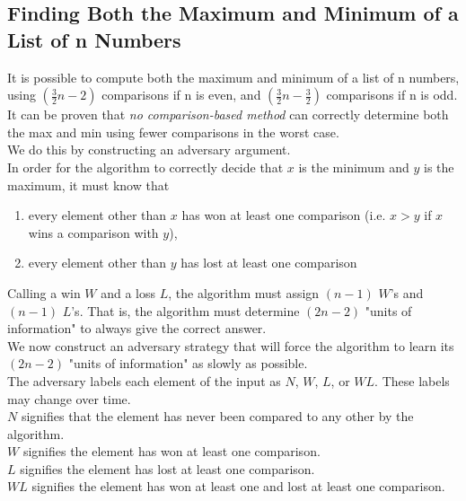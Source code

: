 \documentclass[12pt]{article}
\theoremstyle{plain}
\theoremstyle{definition}
\newcommand{\lecture}[1]{\marginpar{{\footnotesize $\leftarrow$ \underline{#1}}}}
\begin{document}
\subsection{Finding Both the Maximum and Minimum of a List of n Numbers}
It is possible to compute both the maximum and minimum of a list of n numbers, using $(\frac{3}{2}n - 2)$ comparisons if n is even, and $(\frac{3}{2}n - \frac{3}{2})$ comparisons if n is odd. \\
It can be proven that \emph{no comparison-based method} can correctly determine both the max and min using fewer comparisons in the worst case. \\

We do this by constructing an adversary argument. \\

In order for the algorithm to correctly decide that $x$ is the minimum and $y$ is the maximum, it must know that
\begin{enumerate}
  \item every element other than $x$ has won at least one comparison (i.e. $x > y$ if $x$ wins a comparison with $y$),
  \item every element other than $y$ has lost at least one comparison
\end{enumerate}
Calling a win $W$ and a loss $L$, the algorithm must assign $(n - 1)$ $W$'s and $(n - 1)$ $L$'s.
That is, the algorithm must determine $(2n - 2)$ "units of information" to always give the correct answer. \\

We now construct an adversary strategy that will force the algorithm to learn its $(2n - 2)$ "units of information" as slowly as possible. \\
The adversary labels each element of the input as $N$, $W$, $L$, or $WL$.
These labels may change over time. \\
$N$ signifies that the element has never been compared to any other by the algorithm. \\
$W$ signifies the element has won at least one comparison. \\
$L$ signifies the element has lost at least one comparison. \\
$WL$ signifies the element has won at least one and lost at least one comparison. \\

\lecture{2016/10/27}
\end{document}
